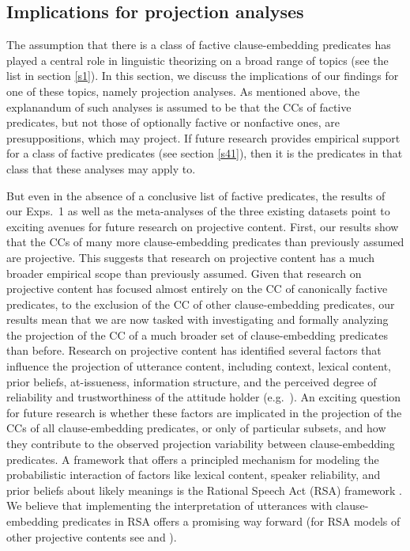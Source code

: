 \documentclass{language}
\newcommand{\6}{\mbox{$[\hspace*{-.6mm}[$}}
\newcommand{\9}{\mbox{$]\hspace*{-.6mm}]$}}
\begin{document}
\subsection{Implications for projection analyses}\label{s43}

The assumption that there is a class of factive clause-embedding predicates has played a central role in linguistic theorizing on a broad range of topics (see the list in section \ref{s1}). In this section, we discuss the implications of our findings for one of these topics, namely projection analyses. As mentioned above, the explanandum of such analyses is assumed to be that the CCs of factive predicates, but not those of optionally factive or nonfactive ones, are presuppositions, which may project. If future research provides empirical support for a class of factive predicates (see section \ref{s41}), then it is the predicates in that class that these analyses may apply to.  

But even in the absence of a conclusive list of factive predicates, the results of our Exps.~1 as well as the meta-analyses of the three existing datasets point to exciting avenues for future research on projective content. First, our results show that the CCs of many more clause-embedding predicates than previously assumed are projective. This suggests that research on projective content has a much broader empirical scope than previously assumed. Given that research on projective content has focused almost entirely on the CC of  canonically factive predicates, to the exclusion of the CC of other clause-embedding predicates, our results mean that we are now tasked with investigating and formally analyzing the projection of the CC of a much broader set of clause-embedding predicates than before. Research on projective content has identified several factors that influence the projection of utterance content, including context, lexical content, prior beliefs, at-issueness, information structure, and the perceived degree of reliability and trustworthiness of the attitude holder (e.g.\ \citealt{gazdar79a,gazdar79b,beaver-belly,schlenker10,brst-salt10,best-question,abrusan2011,abrusan2016,anand-hacquard2014,cummins-rohde2015,djaerv-bacovcin-salt27,mahler-etal2020,mahler2020,tonhauser-salt26,tonhauser-guarani-variability,tbd-variability,tonhauser-etal-sub23,degen-tonhauser-openmind}). An exciting question for future research is whether these factors are implicated in the projection of the CCs of all clause-embedding predicates, or only of particular subsets, and how they contribute to the observed projection variability between clause-embedding predicates. A framework that offers a principled mechanism for modeling the probabilistic interaction of factors like lexical content, speaker reliability, and prior beliefs about likely meanings is the Rational Speech Act (RSA) framework \citep{bergen2016}. We believe that implementing the interpretation of utterances with clause-embedding predicates in RSA offers a promising way forward (for RSA models of other projective contents see \citealt{qing-etal2016} and \citealt{stevens-etal2017}). 
\end{document}
